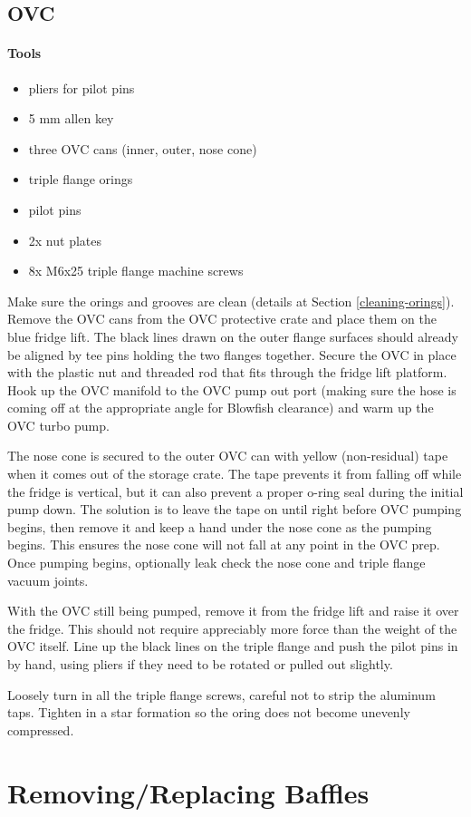 \subsection{OVC}

\paragraph{Tools}
\begin{itemize}
 \item pliers for pilot pins
\item 5 mm allen key
\item three OVC cans (inner, outer, nose cone)
\item triple flange orings
\item pilot pins
\item 2x nut plates
\item 8x M6x25 triple flange machine screws
\end{itemize}

Make sure the orings and grooves are clean (details at Section \ref{cleaning-orings}).  Remove the OVC cans from the OVC protective crate and place them on the blue fridge lift.  The black lines drawn on the outer flange surfaces should already be aligned by tee pins holding the two flanges together.  Secure the OVC in place with the plastic nut and threaded rod that fits through the fridge lift platform.  Hook up the OVC manifold to the OVC pump out port (making sure the hose is coming off at the appropriate angle for Blowfish clearance) and warm up the OVC turbo pump.  

The nose cone is secured to the outer OVC can with yellow (non-residual) tape when it comes out of the storage crate.  The tape prevents it from falling off while the fridge is vertical, but it can also prevent a proper o-ring seal during the initial pump down.  The solution is to leave the tape on until right before OVC pumping begins, then remove it and keep a hand under the nose cone as the pumping begins.  This ensures the nose cone will not fall at any point in the OVC prep.  Once pumping begins, optionally leak check the nose cone and triple flange vacuum joints.

With the OVC still being pumped, remove it from the fridge lift and raise it over the fridge.  This should not require appreciably more force than the weight of the OVC itself.  Line up the black lines on the triple flange and push the pilot pins in by hand, using pliers if they need to be rotated or pulled out slightly.


Loosely turn in all the triple flange screws, careful not to strip the aluminum taps.  Tighten in a star formation so the oring does not become unevenly compressed.

\section{Removing/Replacing \het{} Baffles}
